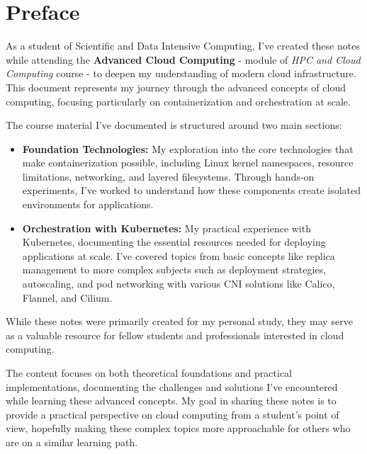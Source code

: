 \chapter*{Preface}

As a student of Scientific and Data Intensive Computing, I've created these notes while attending the \textbf{Advanced Cloud Computing} - module of \textit{HPC and Cloud Computing} course - to deepen my understanding of modern cloud infrastructure. This document represents my journey through the advanced concepts of cloud computing, focusing particularly on containerization and orchestration at scale.

The course material I've documented is structured around two main sections:
\begin{itemize}
    \item \textbf{Foundation Technologies:} My exploration into the core technologies that make containerization possible, including Linux kernel namespaces, resource limitations, networking, and layered filesystems. Through hands-on experiments, I've worked to understand how these components create isolated environments for applications.
    \item \textbf{Orchestration with Kubernetes:} My practical experience with Kubernetes, documenting the essential resources needed for deploying applications at scale. I've covered topics from basic concepts like replica management to more complex subjects such as deployment strategies, autoscaling, and pod networking with various CNI solutions like Calico, Flannel, and Cilium.
\end{itemize}

While these notes were primarily created for my personal study, they may serve as a valuable resource for fellow students and professionals interested in cloud computing.

The content focuses on both theoretical foundations and practical implementations, documenting the challenges and solutions I've encountered while learning these advanced concepts. My goal in sharing these notes is to provide a practical perspective on cloud computing from a student's point of view, hopefully making these complex topics more approachable for others who are on a similar learning path.